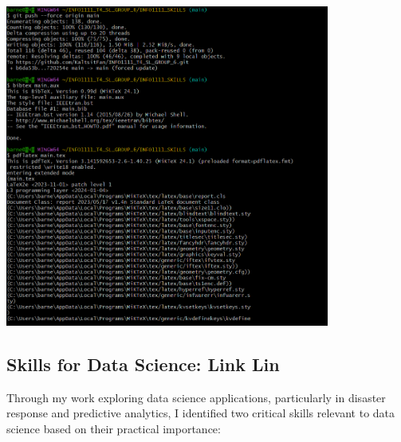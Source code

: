 \documentclass[a4paper, 11pt]{report}
\begin{document}
\begin{center}
\includegraphics[width=0.8\textwidth]{BZ/3.png}
\end{center}

\subsection*{Skills for Data Science: Link Lin}

Through my work exploring data science applications, particularly in disaster response and predictive analytics, I identified two critical skills relevant to data science based on their practical importance:
\end{document}
